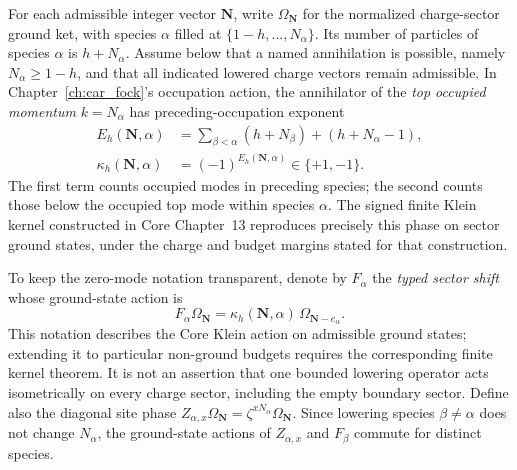 For each admissible integer vector \(\mathbf N\), write
\(\Omega_{\mathbf N}\) for the normalized charge-sector ground ket, with
species \(\alpha\) filled at
\(\{1-h,\ldots,N_\alpha\}\).  Its number of particles of species
\(\alpha\) is \(h+N_\alpha\).  Assume below that a named annihilation is
possible, namely \(N_\alpha\geq1-h\), and that all indicated lowered
charge vectors remain admissible.  In Chapter~\ref{ch:car_fock}'s
occupation action, the annihilator of the \emph{top occupied momentum}
\(k=N_\alpha\) has preceding-occupation exponent
\begin{equation}
 \begin{split}
 E_h(\mathbf N,\alpha)
   &=\sum_{\beta<\alpha}(h+N_\beta)
       +(h+N_\alpha-1),\\
 \kappa_h(\mathbf N,\alpha)
   &=(-1)^{E_h(\mathbf N,\alpha)}\in\{+1,-1\}.
 \end{split}
 \label{eq:ch21-pair-klein-phase}
\end{equation}
The first term counts occupied modes in preceding species; the second
counts those below the occupied top mode within species \(\alpha\).
The signed finite Klein kernel constructed in Core Chapter~13
reproduces precisely this phase on sector ground states, under the
charge and budget margins stated for that construction.

To keep the zero-mode notation transparent, denote by \(F_\alpha\) the
\emph{typed sector shift} whose ground-state action is
\begin{equation}
 F_\alpha\Omega_{\mathbf N}
  =\kappa_h(\mathbf N,\alpha)\,
    \Omega_{\mathbf N-e_\alpha}.
 \label{eq:ch21-pair-klein-action}
\end{equation}
This notation describes the Core Klein action on admissible ground
states; extending it to particular non-ground budgets requires the
corresponding finite kernel theorem.  It is not an assertion that one
bounded lowering operator acts isometrically on every charge sector,
including the empty boundary sector.  Define also the diagonal site phase
\(Z_{\alpha,x}\Omega_{\mathbf N}=\zeta^{xN_\alpha}
\Omega_{\mathbf N}\).  Since lowering species \(\beta\ne\alpha\)
does not change \(N_\alpha\), the ground-state actions of
\(Z_{\alpha,x}\) and \(F_\beta\) commute for distinct species.

